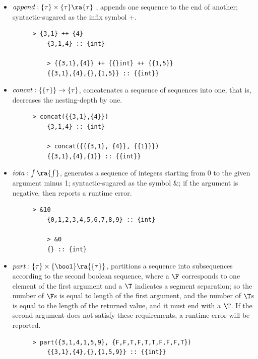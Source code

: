 \begin{itemize}

	\item $\*{append : \{\tau\} \times \{\tau\} \ra \{\tau\}}$ , 
	appends one sequence to the end of another; syntactic-sugared as the infix symbol {\++}.

	\begin{figure}[H]
	\begin{example}
	\end{example}
	\begin{lstlisting}[style = nesl-style]
	> {3,1} ++ {4}
	{3,1,4} :: {int}
	
	> {{3,1},{4}} ++ {{}int} ++ {{1,5}}
	{{3,1},{4},{},{1,5}} :: {{int}}
	\end{lstlisting}
	\end{figure}


	\item $\*{concat: \{\{\tau\}\} \rightarrow \{\tau\} }$, concatenates a sequence of sequences into one, that is, decreases the nesting-depth by one.
	\begin{figure}[H]
	\begin{example}
	\end{example}
	\begin{lstlisting}[style = nesl-style]
	> concat({{3,1},{4}})
	{3,1,4} :: {int}
	
	> concat({{{3,1}, {4}}, {{1}}})
	{{3,1},{4},{1}} :: {{int}}
	\end{lstlisting}
	\end{figure}

	\item $\*{iota: \int \ra \{\int\}}$, generates a sequence of integers starting from 0 to the given argument minus 1; syntactic-sugared as the symbol \&; if the argument is negative, then reports a runtime error.
	\begin{figure}[H]
	\begin{example}
	\end{example}
	\begin{lstlisting}[style = nesl-style]
	> &10
	{0,1,2,3,4,5,6,7,8,9} :: {int}
	
	> &0
	{} :: {int}
	\end{lstlisting}
	\end{figure}
	
	\item $\*{part: \{\tau\} \times \{\bool\} \ra  \{\{\tau\}\}}$, partitions a sequence into subsequences according to the second boolean sequence, where a $\F$ corresponds to one element of the first argument and a $\T$ indicates a segment separation; so the number of $\F$s is equal to length of the first argument, and the number of $\T$s is equal to the length of the returned value, and it must end with a $\T$. 
	If the second argument does not satisfy these requirements, a runtime error will be reported.
	\begin{figure}[H]
	\begin{example}
	\end{example}
	\begin{lstlisting}[style = nesl-style]
	> part({3,1,4,1,5,9}, {F,F,T,F,T,T,F,F,F,T})
	{{3,1},{4},{},{1,5,9}} :: {{int}}
	

\end{lstlisting}
\end{figure}
\end{itemize}
